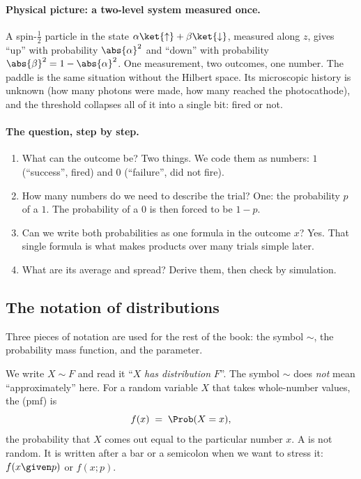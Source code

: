 \paragraph{Physical picture: a two-level system measured once.}
A spin-$\tfrac12$ particle in the state $\alpha\ket{\uparrow}+\beta\ket{\downarrow}$, measured along $z$, gives ``up'' with probability $\abs{\alpha}^2$ and ``down'' with probability $\abs{\beta}^2=1-\abs{\alpha}^2$. One measurement, two outcomes, one number. The paddle is the same situation without the Hilbert space. Its microscopic history is unknown (how many photons were made, how many reached the photocathode), and the threshold collapses all of it into a single bit: fired or not.

\paragraph{The question, step by step.}
\begin{enumerate}[leftmargin=1.6em,itemsep=1pt]
  \item What can the outcome be? Two things. We code them as numbers: $1$ (``success'', fired) and $0$ (``failure'', did not fire).
  \item How many numbers do we need to describe the trial? One: the probability $p$ of a $1$. The probability of a $0$ is then forced to be $1-p$.
  \item Can we write both probabilities as one formula in the outcome $x$? Yes. That single formula is what makes products over many trials simple later.
  \item What are its average and spread? Derive them, then check by simulation.
\end{enumerate}

\subsection{The notation of distributions}

Three pieces of notation are used for the rest of the book: the symbol $\sim$, the probability mass function, and the parameter.

\begin{workdef}
We write $X\sim F$ and read it ``$X$ \emph{has distribution} $F$''. The symbol $\sim$ does \emph{not} mean ``approximately'' here. For a random variable $X$  that takes whole-number values, the  (pmf) is
\[
  f(x)\;=\;\Prob(X=x),
\]
the probability that $X$ comes out equal to the particular number $x$. A   is not random. It is written after a bar or a semicolon when we want to stress it: $f(x\given p)$ or $f(x;p)$.
\end{workdef}


